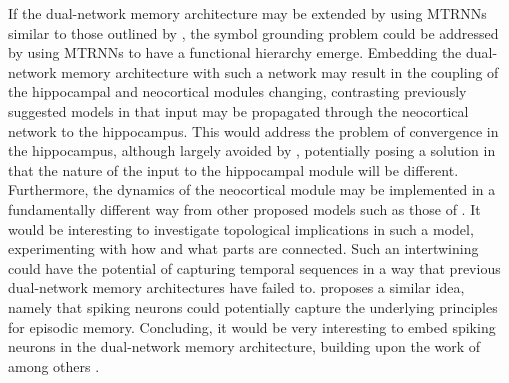 If the dual-network memory architecture may be extended by using MTRNNs similar to those outlined by \cite{Tani2014}, the symbol grounding problem could be addressed by using MTRNNs to have a functional hierarchy emerge. Embedding the dual-network memory architecture with such a network may result in the coupling of the hippocampal and neocortical modules changing, contrasting previously suggested models in that input may be propagated through the neocortical network to the hippocampus.
This would address the problem of convergence in the hippocampus, although largely avoided by \cite{Hattori2014}, potentially posing a solution in that the nature of the input to the hippocampal module will be different. Furthermore, the dynamics of the neocortical module may be implemented in a fundamentally different way from other proposed models such as those of \cite{Ans1997, Ans2000, French2001, Hattori2010, Hattori2014}. 
It would be interesting to investigate topological implications in such a model, experimenting with how and what parts are connected.
Such an intertwining could have the potential of capturing temporal sequences in a way that previous dual-network memory architectures have failed to. \cite{Hattori2014} proposes a similar idea, namely that spiking neurons could potentially capture the underlying principles for episodic memory. Concluding, it would be very interesting to embed spiking neurons in the dual-network memory architecture, building upon the work of among others \cite{Yamashita2008, McClelland1995, Hattori2014}.

